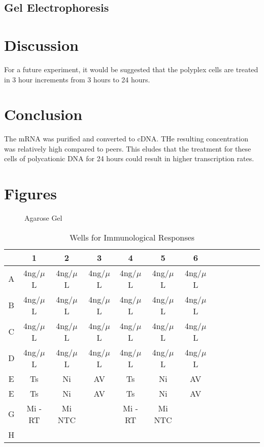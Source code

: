 \documentclass[journal, a4paper]{IEEEtran}
\begin{document}
  \subsection{Gel Electrophoresis}

\section{Discussion}

For a future experiment, it would be suggested that the polyplex cells are treated in 3 hour increments from 3 hours to 24 hours.

\section{Conclusion}
The mRNA was purified and converted to cDNA. THe resulting concentration was relatively high compared to peers. This eludes that the
treatment for these cells of polycationic DNA for 24 hours could result in higher transcription rates.

\section{Figures}

  \begin{figure}[t]
    \centering
    \caption{Agarose Gel}
    \label{fig:mesh1}
  \end{figure}

  \begin{table}[!hbt]
    \begin{center}
    \caption{Wells for Immunological Responses}
    \label{tab:simParameters}
    \begin{tabular}{|c|c|c|c|c|c|c|c|c|c|c|c|c|}
      \hline
      & 1 & 2 & 3 & 4 & 5 & 6\\
      \hline
      A & 4ng/$\mu$L & 4ng/$\mu$L & 4ng/$\mu$L & 4ng/$\mu$L & 4ng/$\mu$L & 4ng/$\mu$L\\
      \hline
      B & 4ng/$\mu$L & 4ng/$\mu$L & 4ng/$\mu$L & 4ng/$\mu$L & 4ng/$\mu$L & 4ng/$\mu$L\\
      \hline
      C & 4ng/$\mu$L & 4ng/$\mu$L & 4ng/$\mu$L & 4ng/$\mu$L & 4ng/$\mu$L & 4ng/$\mu$L\\
      \hline
      D & 4ng/$\mu$L & 4ng/$\mu$L & 4ng/$\mu$L & 4ng/$\mu$L & 4ng/$\mu$L & 4ng/$\mu$L\\
      \hline
      E & Ts & Ni & AV & Ts & Ni & AV\\
      \hline
      E & Ts & Ni & AV & Ts & Ni & AV\\
      \hline
      G & Mi -RT & Mi NTC & & Mi -RT & Mi NTC & \\
      \hline
      H & & & & & &\\
      \hline
    \end{tabular}
    \end{center}
  \end{table}
\end{document}
